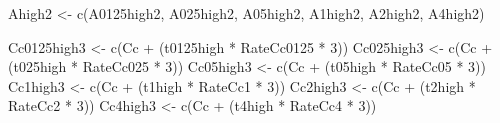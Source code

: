 \documentclass[
]{krantz}
\makeatletter
\newenvironment{Shaded}{\begin{snugshade}}{\end{snugshade}}
\newcommand{\DecValTok}[1]{\textcolor[rgb]{0.00,0.00,0.81}{#1}}
\newcommand{\FunctionTok}[1]{\textcolor[rgb]{0.00,0.00,0.00}{#1}}
\newcommand{\NormalTok}[1]{#1}
\newcommand{\OtherTok}[1]{\textcolor[rgb]{0.56,0.35,0.01}{#1}}
\newcommand{\SpecialCharTok}[1]{\textcolor[rgb]{0.00,0.00,0.00}{#1}}
\newenvironment{kframe}{%
\medskip{}
\setlength{\fboxsep}{.8em}
 \def\at@end@of@kframe{}%
 \ifinner\ifhmode%
  \def\at@end@of@kframe{\end{minipage}}%
  \begin{minipage}{\columnwidth}%
 \fi\fi%
 \def\FrameCommand##1{\hskip\@totalleftmargin \hskip-\fboxsep
 \colorbox{shadecolor}{##1}\hskip-\fboxsep
     \hskip-\linewidth \hskip-\@totalleftmargin \hskip\columnwidth}%
 \MakeFramed {\advance\hsize-\width
   \@totalleftmargin\z@ \linewidth\hsize
   \@setminipage}}%
 {\par\unskip\endMakeFramed%
 \at@end@of@kframe}
\renewenvironment{Shaded}{\begin{kframe}}{\end{kframe}}
\makeatother
\begin{document}
\begin{Shaded}
\begin{Highlighting}[]
\NormalTok{Ahigh2 }\OtherTok{\textless{}{-}}
  \FunctionTok{c}\NormalTok{(A0125high2, A025high2, A05high2, A1high2, A2high2, A4high2)}

\NormalTok{Cc0125high3 }\OtherTok{\textless{}{-}} \FunctionTok{c}\NormalTok{(Cc }\SpecialCharTok{+}\NormalTok{ (t0125high }\SpecialCharTok{*}\NormalTok{ RateCc0125 }\SpecialCharTok{*} \DecValTok{3}\NormalTok{))}
\NormalTok{Cc025high3 }\OtherTok{\textless{}{-}} \FunctionTok{c}\NormalTok{(Cc }\SpecialCharTok{+}\NormalTok{ (t025high }\SpecialCharTok{*}\NormalTok{ RateCc025 }\SpecialCharTok{*} \DecValTok{3}\NormalTok{))}
\NormalTok{Cc05high3 }\OtherTok{\textless{}{-}} \FunctionTok{c}\NormalTok{(Cc }\SpecialCharTok{+}\NormalTok{ (t05high }\SpecialCharTok{*}\NormalTok{ RateCc05 }\SpecialCharTok{*} \DecValTok{3}\NormalTok{))}
\NormalTok{Cc1high3 }\OtherTok{\textless{}{-}} \FunctionTok{c}\NormalTok{(Cc }\SpecialCharTok{+}\NormalTok{ (t1high }\SpecialCharTok{*}\NormalTok{ RateCc1 }\SpecialCharTok{*} \DecValTok{3}\NormalTok{))}
\NormalTok{Cc2high3 }\OtherTok{\textless{}{-}} \FunctionTok{c}\NormalTok{(Cc }\SpecialCharTok{+}\NormalTok{ (t2high }\SpecialCharTok{*}\NormalTok{ RateCc2 }\SpecialCharTok{*} \DecValTok{3}\NormalTok{))}
\NormalTok{Cc4high3 }\OtherTok{\textless{}{-}} \FunctionTok{c}\NormalTok{(Cc }\SpecialCharTok{+}\NormalTok{ (t4high }\SpecialCharTok{*}\NormalTok{ RateCc4 }\SpecialCharTok{*} \DecValTok{3}\NormalTok{))}


\end{Highlighting}
\end{Shaded}
\end{document}
